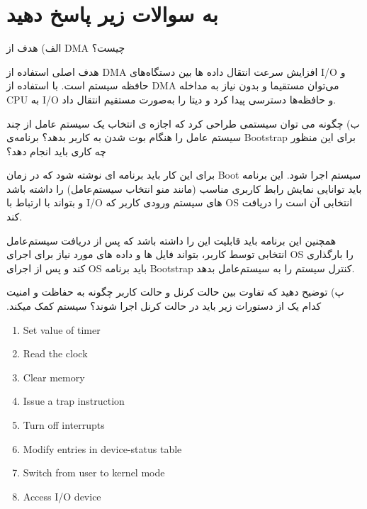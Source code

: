 \section{به سوالات زیر پاسخ دهید}




الف)‌ هدف از DMA چیست؟
\begin{qsolve}
	هدف اصلی استفاده از DMA افزایش سرعت انتقال داده ها بین دستگاه‌های I/O و حافظه سیستم است. با استفاده از DMA می‌توان مستقیما و بدون نیاز به مداخله CPU به I/O و حافظه‌ها دسترسی پیدا کرد و دیتا را به‌صورت مستقیم انتقال داد.
\end{qsolve}







ب) ‫چگونه‬ ‫می‬ ‫توان‬ ‫سیستمی ‬‫طراحی‬ ‫کرد‬ ‫که‬ ‫اجازه‬ ‫ی‬ ‫انتخاب‬ ‫یک‬ ‫سیستم‬ ‫عامل‬ ‫از‬ ‫چند‬ ‫سیستم‬ ‫عامل‬ ‫را‬ ‫هنگام‬ بوت شدن به کاربر بدهد؟ برنامه‌ی Bootstrap ‫برای‬ ‫این‬ ‫منظور‬ ‫چه‬ ‫کاری‬ ‫باید‬ ‫انجام‬ ‫دهد؟‬
\begin{qsolve}
	برای این کار باید برنامه ای نوشته شود که در زمان Boot سیستم اجرا شود. این برنامه باید توانایی نمایش رابط کاربری مناسب (مانند منو انتخاب سیستم‌عامل) را داشته باشد و بتواند با ارتباط با I/O های سیستم ورودی کاربر که OS انتخابی آن است را دریافت کند.
	
	همچنین این برنامه باید قابلیت این را داشته باشد که پس از دریافت سیستم‌عامل انتخابی توسط کاربر، بتواند فایل ها و داده های مورد نیاز برای اجرای OS را بارگذاری کند و پس از اجرای OS باید برنامه Bootstrap کنترل سیستم را به سیستم‌عامل بدهد.
\end{qsolve}








پ) ‫توضیح‬ ‫دهید‬ ‫که‬ ‫تفاوت‬ ‫بین‬ ‫حالت‬ ‫کرنل‬ ‫و‬ ‫حالت‬ ‫کاربر‬ ‫چگونه‬ ‫به‬ ‫حفاظت‬ ‫و‬ ‫امنیت‬ سیستم ‬‫کمک‬ ‫میکند‪.‬‬ ‫کدام یک ‬‫از‬ ‫دستورات‬ ‫زیر‬ ‫باید‬ ‫در‬ ‫حالت‬ ‫کرنل‬ ‫اجرا‬ ‫شوند؟‬
\begin{latin}
	\begin{enumerate}[label=\Alph*)]
		\item ‫‪Set value of timer
		\item Read the clock
		\item Clear memory
		\item ‫‪Issue a trap instruction
		\item ‫‪Turn off interrupts
		\item ‫‪Modify ‫‪entries‬‬ in device-status table
		\item ‫‪Switch from user to kernel mode
		\item ‫‪Access I/O device
	\end{enumerate}
\end{latin}


